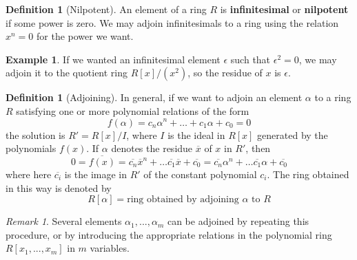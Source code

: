 \documentclass[12pt]{article}
\theoremstyle{definition}
\newtheorem{defn}[thm]{Definition}
\newtheorem{eg}[thm]{Example}
\theoremstyle{remark}
\newtheorem{rmk}[thm]{Remark}
\numberwithin{equation}{section}
\newcommand\B[1]{\textbf{ #1}}
\begin{document}
\begin{defn}[Nilpotent]
        An element of a ring $R$ is \B{infinitesimal} or \B{nilpotent} if some power is zero. We may adjoin infinitesimals to a ring using the relation $x^n = 0$ for the power we want.
\end{defn}

\vspace{15pt}

\begin{eg}
        If we wanted an infinitesimal element $\epsilon$ such that $\epsilon^2=0$, we may adjoin it to the quotient ring $R[x]/(x^2)$, so the residue of $x$ is $\epsilon$.
\end{eg}


\vspace{15pt}


\begin{defn}[Adjoining]
        In general, if we want to adjoin an element $\alpha$ to a ring $R$ satisfying one or more polynomial relations of the form \begin{equation}
                f(\alpha) = c_n\alpha^n+\hdots + c_1\alpha + c_0 = 0
        \end{equation}
        the solution is $R' = R[x]/I$, where $I$ is the ideal in $R[x]$ generated by the polynomials $f(x)$. If $\alpha$ denotes the residue $\overline{x}$ of $x$ in $R'$, then \begin{equation}
                0 = \overline{f(x)} = \overline{c_n}\overline{x}^n+\hdots \overline{c_1}\overline{x} + \overline{c_0} = \overline{c_n}\alpha^n + \hdots \overline{c_1}\alpha + \overline{c_0}
        \end{equation}
        where here $\overline{c_i}$ is the image in $R'$ of the constant polynomial $c_i$. The ring obtained in this way is denoted by \begin{equation}
                R[\alpha] = \text{ring obtained by adjoining $\alpha$ to $R$}
        \end{equation}
\end{defn}

\vspace{15pt}


\begin{rmk}
        Several elements $\alpha_1,...,\alpha_m$ can be adjoined by repeating this procedure, or by introducing the appropriate relations in the polynomial ring $R[x_1,...,x_m]$ in $m$ variables. 
\end{rmk}


\vspace{15pt}
\end{document}
